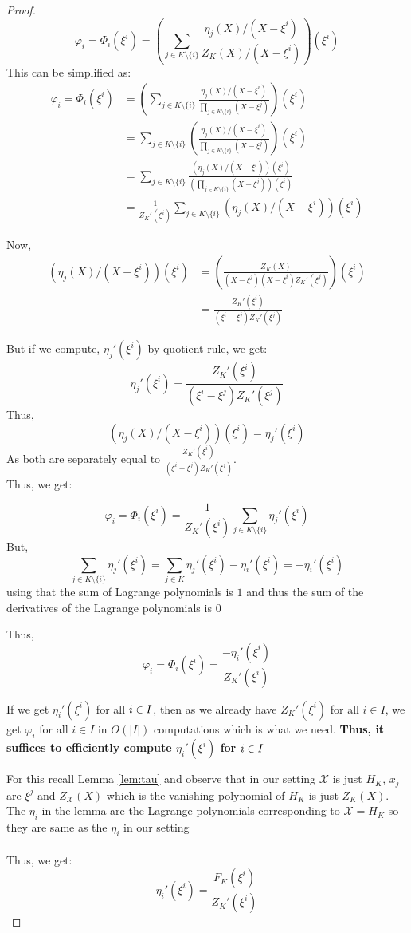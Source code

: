 \begin{proof}
    $$\varphi_i = \Phi_i(\xi^i) = \left(\sum_{j\in K\setminus \{i\}}\frac{\eta_j(X)/(X-\xi^i)}{Z_K(X)/(X-\xi^i)}\right)(\xi^i)$$
    This can be simplified as:
    \begin{align*}\varphi_i = \Phi_i(\xi^i) &= \left(\sum_{j\in K\setminus \{i\}}\frac{\eta_j(X)/(X-\xi^i)}{\prod_{j \in K \setminus \{i\}}(X-\xi^j)}\right)(\xi^i)\\
    &= \sum_{j\in K\setminus \{i\}}\left(\frac{\eta_j(X)/(X-\xi^i)}{\prod_{j \in K \setminus \{i\}}(X-\xi^j)}\right)(\xi^i)\\
    &= \sum_{j\in K\setminus \{i\}}\frac{\left(\eta_j(X)/(X-\xi^i)\right)(\xi^i)}{\left(\prod_{j \in K \setminus \{i\}}(X-\xi^j)\right)(\xi^i)}\\
    &= \frac{1}{Z_K'(\xi^i)}\sum_{j\in K\setminus \{i\}}\left(\eta_j(X)/(X-\xi^i)\right)(\xi^i)
    \end{align*}

    Now, \begin{align*}
             \left(\eta_j(X)/(X-\xi^i)\right)(\xi^i)&=\left(\frac{Z_K(X)}{(X-\xi^j)(X-\xi^i)Z_K'(\xi^j)}\right)(\xi^i)\\
             &= \frac{Z_K'(\xi^i)}{(\xi^i-\xi^j)Z_K'(\xi^j)}
    \end{align*}

    But if we compute, $\eta_j'(\xi^i)$ by quotient rule, we get:
    $$\eta_j'(\xi^i)=\frac{Z_K'(\xi^i)}{(\xi^i-\xi^j)Z_K'(\xi^j)}$$
    Thus,
    $$\left(\eta_j(X)/(X-\xi^i)\right)(\xi^i)=\eta_j'(\xi^i) $$
    As both are separately equal to $\frac{Z_K'(\xi^i)}{(\xi^i-\xi^j)Z_K'(\xi^j)}$.\\
    Thus, we get:


    $$\varphi_i =\Phi_i(\xi^i) =  \frac{1}{Z_K'(\xi^i)}\sum_{j\in K\setminus \{i\}}\eta_j'(\xi^i)$$
    But, $$\sum_{j\in K\setminus \{i\}}\eta_j'(\xi^i)= \sum_{j\in K}\eta_j'(\xi^i)-\eta_i'(\xi^i)=-\eta_i'(\xi^i)$$
    using that the sum of Lagrange polynomials is $1$ and thus the sum of the derivatives of the Lagrange polynomials is $0$

    Thus,
    $$\varphi_i =\Phi_i(\xi^i) = \frac{-\eta_i'(\xi^i)}{Z_K'(\xi^i)}$$

    If we get $\eta_i'(\xi^i)$ for all $i\in I$, then as we already have $Z_K'(\xi^i)$ for all $i \in I$, we get $\varphi_i$ for all $i \in I$ in $O(|I|)$ computations which is what we need. \textbf{Thus, it suffices to efficiently compute $\eta_i'(\xi^i)$ for $i\in I$}

    For this recall Lemma \ref{lem:tau} and observe that in our setting $\mathcal{X}$ is just $H_K$, $x_j$ are $\xi^j$ and $Z_\mathcal{X}(X)$ which is the vanishing polynomial of $H_K$ is just $Z_K(X)$. The $\eta_i$ in the lemma are the Lagrange polynomials corresponding to $\mathcal{X}=H_K$ so they are same as the $\eta_i$ in our setting\\\\
    Thus, we get:
    $$\eta_i'(\xi^i)=\frac{F_K(\xi^i)}{Z_K'(\xi^i)}$$


\end{proof}
